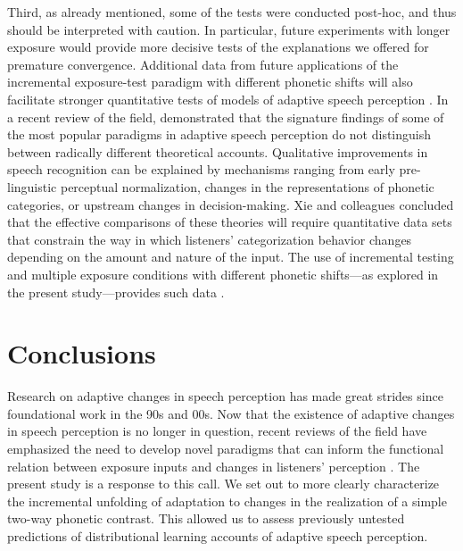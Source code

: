 \documentclass[
  11pt,
  man,mask,floatsintext]{apa6}
\begin{document}
Third, as already mentioned, some of the tests were conducted post-hoc, and thus should be interpreted with caution. In particular, future experiments with longer exposure would provide more decisive tests of the explanations we offered for premature convergence. Additional data from future applications of the incremental exposure-test paradigm with different phonetic shifts will also facilitate stronger quantitative tests of models of adaptive speech perception \autocites[in the spirit of][]{coretta2023,guest-martin2021,yarkoni-westfall2017,xie2023}. In a recent review of the field, \textcite{xie2023} demonstrated that the signature findings of some of the most popular paradigms in adaptive speech perception do not distinguish between radically different theoretical accounts. Qualitative improvements in speech recognition can be explained by mechanisms ranging from early pre-linguistic perceptual normalization, changes in the representations of phonetic categories, or upstream changes in decision-making. Xie and colleagues concluded that the effective comparisons of these theories will require quantitative data sets that constrain the way in which listeners' categorization behavior changes depending on the amount and nature of the input. The use of incremental testing and multiple exposure conditions with different phonetic shifts---as explored in the present study---provides such data \autocite[see also][]{xie-kurumada2024}.

\section{Conclusions}\label{conclusions}

Research on adaptive changes in speech perception has made great strides since foundational work in the 90s and 00s. Now that the existence of adaptive changes in speech perception is no longer in question, recent reviews of the field have emphasized the need to develop novel paradigms that can inform the functional relation between exposure inputs and changes in listeners' perception \autocite{coretta2023,schertz-clare2020,xie2023}. The present study is a response to this call. We set out to more clearly characterize the incremental unfolding of adaptation to changes in the realization of a simple two-way phonetic contrast. This allowed us to assess previously untested predictions of distributional learning accounts of adaptive speech perception.
\end{document}
